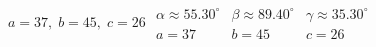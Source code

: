 { $a = 37, \; b = 45, \; c = 26$}
{ $\begin{array}{lll}\alpha \approx 55.30^{\circ} & \beta \approx 89.40^{\circ} & \gamma \approx 35.30^{\circ} \\a = 37 & b = 45 & c = 26 \end{array}$}
